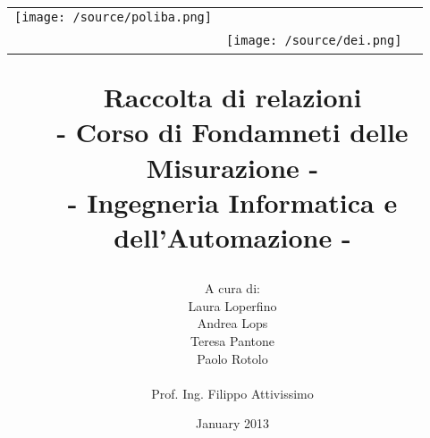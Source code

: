 \documentclass[a4paper, right=1cm]{book}
\begin{document}
	\layout
\title{\begin{center}
		\setlength{\tabcolsep}{0pt}
		\begin{tabular}{>{\raggedleft}m{3cm}>{\centering}m{\textwidth - 5cm\relax}>{\raggedright}m{2.5cm}}
			\texttt{[image: /source/poliba.png]}%
			&%
			\textbf{ } \\[5pt]%
			\textbf{\ }%
			&%
			\texttt{[image: /source/dei.png]} %
		\end{tabular}
	\end{center}
	\textbf{Raccolta di relazioni\\}
	\textbf{\large- Corso di Fondamneti delle Misurazione -\\ }
	{\normalsize 
		- Ingegneria Informatica e dell'Automazione -
}}
\author{A cura di:\\
	Laura Loperfino\\
	Andrea Lops \\
	Teresa Pantone\\
	Paolo Rotolo\\
	\\
	Prof. Ing. Filippo Attivissimo
}
\date{January 2013}


\frontmatter
\maketitle
\tableofcontents

\mainmatter


\backmatter
\end{document}
